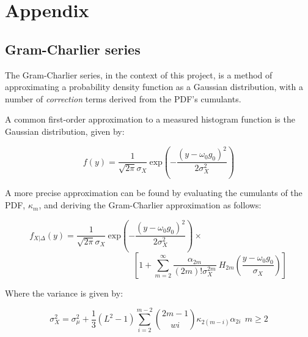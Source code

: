 


\appendix

\part{Appendix} %



\chapter{Gram-Charlier series}

The Gram-Charlier series, in the context of this project, is a method of approximating a probability density function as a Gaussian distribution, with a number of \emph{correction} terms derived from the PDF's cumulants.\cite{[1]}

A common first-order approximation to a measured histogram function is the Gaussian distribution, given by:

$$
f(y) = \frac{1}{\sqrt{2 \pi} \sigma_X} \: \text{exp} \left ( - \frac{(y - \omega_0 g_0)^2}{2 \sigma_X^2} \right )
$$

A more precise approximation can be found by evaluating the cumulants of the PDF, $\kappa_m$, and deriving the Gram-Charlier approximation as follows:

$$
f_{X|\Delta}(y) = \frac{1}{\sqrt{2 \pi} \sigma_X} \: \text{exp} \left ( - \frac{(y - \omega_0 g_0)^2}{2 \sigma_X^2} \right ) \times \qquad \qquad \qquad \qquad \qquad
$$
$$
\qquad \qquad \qquad \qquad \qquad \qquad \left [ 1 + \sum \limits_{m=2}^{\infty} \frac{\alpha_{2m}}{(2m)! \sigma_X^{2m}}  \: H_{2m} \! \left ( \frac{y-\omega_0 g_0}{\sigma_X} \right ) \right ]
$$

Where the variance is given by:

$$
\sigma_X^2 = \sigma_{\mu}^2 + \frac{1}{3} \left ( L^2 - 1 \right ) \sum\limits_{i=2}^{m-2} \binom{2m-1}{wi} \kappa_{2(m-i)} \alpha_{2i} \: \: m \ge 2
$$

